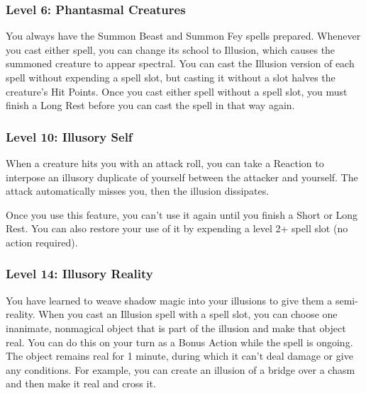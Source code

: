 \documentclass{article}
\begin{document}
\vspace{1em}

\subsubsection*{ Level 6: Phantasmal Creatures }

You always have the Summon Beast and Summon Fey spells prepared. Whenever you cast either spell, you can change its school to Illusion, which causes the summoned creature to appear spectral. You can cast the Illusion version of each spell without expending a spell slot, but casting it without a slot halves the creature’s Hit Points. Once you cast either spell without a spell slot, you must finish a Long Rest before you can cast the spell in that way again.

\vspace{1em}

\subsubsection*{ Level 10: Illusory Self }

When a creature hits you with an attack roll, you can take a Reaction to interpose an illusory duplicate of yourself between the attacker and yourself. The attack automatically misses you, then the illusion dissipates.

Once you use this feature, you can't use it again until you finish a Short or Long Rest. You can also restore your use of it by expending a level 2+ spell slot (no action required).

\vspace{1em}

\subsubsection*{ Level 14: Illusory Reality }

You have learned to weave shadow magic into your illusions to give them a semi-reality. When you cast an Illusion spell with a spell slot, you can choose one inanimate, nonmagical object that is part of the illusion and make that object real. You can do this on your turn as a Bonus Action while the spell is ongoing. The object remains real for 1 minute, during which it can't deal damage or give any conditions. For example, you can create an illusion of a bridge over a chasm and then make it real and cross it.

\vspace{1em}
\end{document}
